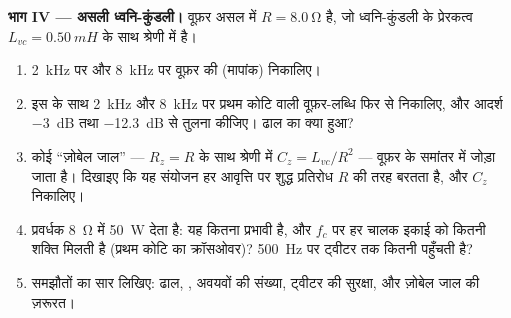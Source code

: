 \begin{problem}
\medskip
\noindent\textbf{भाग IV --- असली ध्वनि-कुंडली।}
वूफ़र असल में $R = \qty{8.0}{\ohm}$ है, जो ध्वनि-कुंडली के प्रेरकत्व
$L_{vc} = \qty{0.50}{mH}$ के साथ श्रेणी में है।
\begin{enumerate}[resume]
  \item \qty{2}{kHz} पर और \qty{8}{kHz} पर वूफ़र की  (मापांक)
        निकालिए।
  \item इस  के साथ \qty{2}{kHz} और \qty{8}{kHz} पर प्रथम कोटि
        वाली वूफ़र-लब्धि फिर से निकालिए, और आदर्श
        \qty{-3}{dB} तथा \qty{-12.3}{dB} से तुलना कीजिए। ढाल का क्या हुआ?
  \item कोई ``ज़ोबेल जाल'' --- $R_z = R$ के साथ श्रेणी में $C_z =
        L_{vc}/R^2$ --- वूफ़र के समांतर में जोड़ा जाता है। दिखाइए
        कि यह संयोजन हर आवृत्ति पर शुद्ध प्रतिरोध $R$ की तरह बरतता है,
        और $C_z$ निकालिए।
  \item प्रवर्धक \qty{8}{\ohm} में \qty{50}{W} देता है: यह कितना
        प्रभावी  है, और $f_c$ पर हर चालक इकाई को कितनी शक्ति
        मिलती है (प्रथम कोटि का क्रॉसओवर)? \qty{500}{Hz} पर ट्वीटर तक
        कितनी पहुँचती है?
  \item समझौतों का सार लिखिए: ढाल, , अवयवों की संख्या,
        ट्वीटर की सुरक्षा, और ज़ोबेल जाल की ज़रूरत।
\end{enumerate}
\end{problem}
